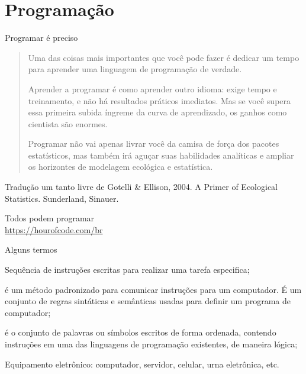 \documentclass[handout]{beamer}
\begin{document}
\section{Programação}
\begin{frame}{Programar é preciso}

  \begin{quote}
    Uma das coisas mais importantes que você pode fazer é dedicar um
    tempo para aprender uma linguagem de programação de verdade.

    Aprender a programar é como aprender outro idioma: exige tempo e
    treinamento, e não há resultados práticos imediatos. Mas se você
    supera essa primeira subida íngreme da curva de aprendizado, os
    ganhos como cientista são enormes. 

    Programar não vai apenas
    livrar você da camisa de força dos pacotes estatísticos, mas
    também irá aguçar suas habilidades analíticas e ampliar os
    horizontes de modelagem ecológica e estatística.
  \end{quote}

  Tradução um tanto livre de Gotelli \& Ellison,
2004. A Primer of Ecological Statistics. Sunderland, Sinauer.
  
\end{frame}

\begin{frame}{Todos podem programar}
\centering
{}
 \\
\url{https://hourofcode.com/br}
\end{frame}

\begin{frame}{Alguns termos}
   \begin{description}[<+->]
   \item[Programa] Sequência de instruções escritas para realizar uma tarefa especifica;
    \item[Linguagem de programação] é um método padronizado para comunicar instruções para um computador. É um conjunto de regras sintáticas e semânticas usadas para definir um programa de computador;
    \item[Código fonte] é o conjunto de palavras ou símbolos escritos de forma ordenada, contendo instruções em uma das linguagens de programação existentes, de maneira lógica;
     \item[``Máquina''] Equipamento eletrônico: computador, servidor, celular, urna eletrônica, etc.
   \end{description} 
  \end{frame}
\end{document}
